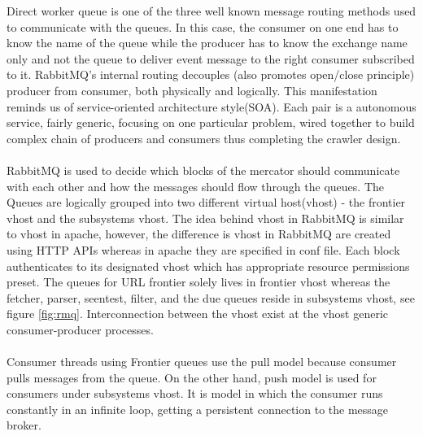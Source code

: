 \noindent
Direct worker queue\cite{asyncmsg} is one of the three well known message routing methods used to communicate with the
queues. In this case, the consumer on one end has to know the name of the queue while the producer has to know the exchange name only and not the queue to deliver event message to the right consumer subscribed to it.
RabbitMQ's internal routing decouples (also promotes open/close principle) producer from consumer, both physically and logically. This manifestation reminds us of service-oriented architecture style(SOA). Each
pair is a autonomous service, fairly generic, focusing on one particular problem, wired together to build complex chain of producers and consumers thus completing the crawler design.
\\
\\
\noindent
RabbitMQ is used to decide which blocks of the mercator should communicate with each other and how the
messages should flow through the queues. The Queues are logically grouped into two different virtual
host(vhost) - the frontier vhost and the subsystems vhost. The idea behind vhost in RabbitMQ is similar
to vhost in apache, however, the difference is vhost in RabbitMQ are created using HTTP APIs whereas
in apache they are specified in conf file. Each block authenticates to its designated vhost which has
appropriate resource permissions preset. The queues for URL frontier solely lives in frontier vhost
whereas the fetcher, parser, seentest, filter, and the due queues reside in subsystems vhost, see figure
\ref{fig:rmq}. Interconnection between the vhost exist at the vhost generic consumer-producer processes.
\\
\\
\noindent
Consumer threads using Frontier queues use the pull model because consumer pulls messages from the queue.
On the other hand, push model is used for consumers under subsystems vhost. It is model in which the
consumer runs constantly in an infinite loop, getting a persistent connection to the message broker.

\pagebreak

